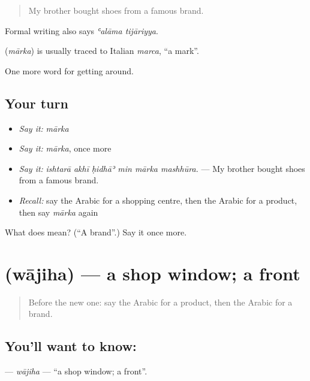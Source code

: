 \begin{quote}
My brother bought shoes from a famous brand.
\end{quote}

Formal writing also says \emph{ʿalāma tijāriyya}.

\begin{cousinweb}
\textbf{} (\emph{mārka}) is usually traced to Italian \emph{marca}, \textquotedblleft{}a mark\textquotedblright{}.
\end{cousinweb}

\begin{grammarlens}[title={What you've built}]
One more word for getting around.
\end{grammarlens}

\subsection*{Your turn}
\begin{itemize}
\raggedright
  \item \emph{Say it:} \emph{mārka}
  \item \emph{Say it:} \emph{mārka}, once more
  \item \emph{Say it:} \emph{ishtarā akhī ḥidhāʾ min mārka mashhūra.} — My brother bought shoes from a famous brand.
  \item \emph{Recall:} say the Arabic for a shopping centre, then the Arabic for a product, then say \emph{mārka} again
\end{itemize}

\begin{tcolorbox}[breakable,colback=teal!4,colframe=teal!35!black,title={Before you move on}]
What does  mean? (\textquotedblleft{}A brand\textquotedblright{}.) Say it once more.
\end{tcolorbox}
\section[\texorpdfstring{\ar{واجهة} (wājiha)}{واجهة (wājiha)}]{ (wājiha) — a shop window; a front}

\label{lesson:AR-C455-wajiha}



\begin{quote}
Before the new one: say the Arabic for a product, then the Arabic for a brand.
\end{quote}

\subsection*{You'll want to know: }
\textbf{} — \emph{wājiha} — \textquotedblleft{}a shop window; a front\textquotedblright{}.

